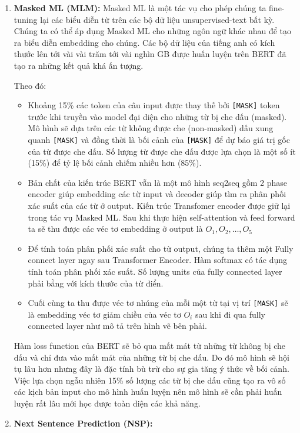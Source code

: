 \begin{enumerate}
    \item \textbf{Masked ML (MLM):}
    Masked ML là một tác vụ cho phép chúng ta fine-tuning lại các biểu diễn từ trên các bộ dữ liệu unsupervised-text bất kỳ. Chúng ta có thể áp dụng Masked ML cho những ngôn ngữ khác nhau để tạo ra biểu diễn embedding cho chúng. Các bộ dữ liệu của tiếng anh có kích thước lên tới vài vài trăm tới vài nghìn GB được huấn luyện trên BERT đã tạo ra những kết quả khá ấn tượng.

    Theo đó:
    \begin{itemize}
        \item Khoảng 15\% các token của câu input được thay thế bởi {\tt [MASK]} token trước khi truyền vào model đại diện cho những từ bị che dấu (masked). Mô hình sẽ dựa trên các từ không được che (non-masked) dấu xung quanh {\tt [MASK]} và đồng thời là bối cảnh của {\tt [MASK]} để dự báo giá trị gốc của từ được che dấu. Số lượng từ được che dấu được lựa chọn là một số ít (15\%) để tỷ lệ bối cảnh chiếm nhiều hơn (85\%).
        \item Bản chất của kiến trúc BERT vẫn là một mô hình seq2seq gồm 2 phase encoder giúp embedding các từ input và decoder giúp tìm ra phân phối xác suất của các từ ở output. Kiến trúc Transfomer encoder được giữ lại trong tác vụ Masked ML. Sau khi thực hiện self-attention và feed forward ta sẽ thu được các véc tơ embedding ở output là $O_1, O_2,…, O_5$
        \item Để tính toán phân phối xác suất cho từ output, chúng ta thêm một Fully connect layer ngay sau Transformer Encoder. Hàm softmax có tác dụng tính toán phân phối xác suất. Số lượng units của fully connected layer phải bằng với kích thước của từ điển.
        \item Cuối cùng ta thu được véc tơ nhúng của mỗi một từ tại vị trí {\tt [MASK]} sẽ là embedding véc tơ giảm chiều của véc tơ $O_i$ sau khi đi qua fully connected layer như mô tả trên hình vẽ bên phải.
    \end{itemize}

    Hàm loss function của BERT sẽ bỏ qua mất mát từ những từ không bị che dấu và chỉ đưa vào mất mát của những từ bị che dấu. Do đó mô hình sẽ hội tụ lâu hơn nhưng đây là đặc tính bù trừ cho sự gia tăng ý thức về bối cảnh. Việc lựa chọn ngẫu nhiên 15\% số lượng các từ bị che dấu cũng tạo ra vô số các kịch bản input cho mô hình huấn luyện nên mô hình sẽ cần phải huấn luyện rất lâu mới học được toàn diện các khả năng.
    \item \textbf{Next Sentence Prediction (NSP):}
    

\end{enumerate}
